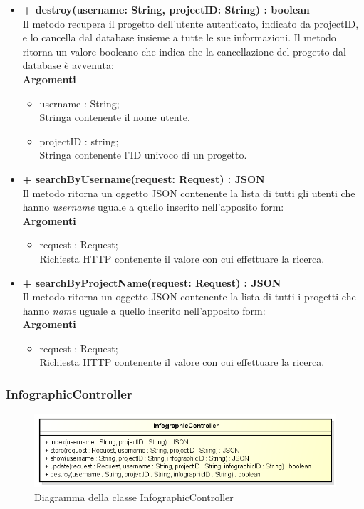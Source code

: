 \begin{itemize}
			\item \textbf{+ destroy(username: String, projectID: String) : boolean}\\
			Il metodo recupera il progetto dell'utente autenticato, indicato da projectID, e lo cancella dal \gls{database} insieme a tutte le sue informazioni. Il metodo ritorna un valore booleano che indica che la cancellazione del progetto dal \gls{database} è avvenuta:\\
			\textbf{Argomenti}
			\begin{itemize}
				\item username : String;\\
				Stringa contenente il nome utente.
				\item projectID : string; \\
				Stringa contenente l'ID univoco di un progetto.
			\end{itemize}
			
			\item \textbf{+ searchByUsername(request: Request) : JSON}\\
			Il metodo ritorna un oggetto \gls{JSON} contenente la lista di tutti gli utenti che hanno \textit{username} uguale a quello inserito nell'apposito form:\\
			\textbf{Argomenti}
			\begin{itemize}
				\item request : Request;\\
				Richiesta HTTP contenente il valore con cui effettuare la ricerca.
			\end{itemize}
			
			\item \textbf{+ searchByProjectName(request: Request) : JSON}\\
			Il metodo ritorna un oggetto \gls{JSON} contenente la lista di tutti i progetti che hanno \textit{name} uguale a quello inserito nell'apposito form:\\
			\textbf{Argomenti}
			\begin{itemize}
				\item request : Request;\\
				Richiesta HTTP contenente il valore con cui effettuare la ricerca.
			\end{itemize}
		\end{itemize}
		
\newpage
\subsubsection{InfographicController}
\begin{figure}[h]
\centering
\includegraphics[width=0.8\linewidth]{img/back_end_http_controllers_infographicController}
\caption[Diagramma della classe InfographicController]{Diagramma della classe InfographicController}
\label{fig:back_end_http_controllers_infographicController}
\end{figure}

